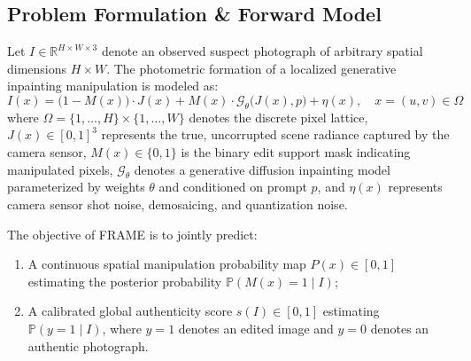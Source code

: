\documentclass[sigconf,review=true]{acmart}
\begin{document}
\subsection{Problem Formulation & Forward Model}
Let $I \in \mathbb{R}^{H \times W \times 3}$ denote an observed suspect photograph of arbitrary spatial dimensions $H \times W$. The photometric formation of a localized generative inpainting manipulation is modeled as:
\begin{equation}
    I(x) = \big(1 - M(x)\big) \cdot J(x) + M(x) \cdot \mathcal{G}_\theta\big(J(x), p\big) + \eta(x), \quad x = (u, v) \in \Omega
    \label{eq:forward_model}
\end{equation}
where $\Omega = \{1, \dots, H\} \times \{1, \dots, W\}$ denotes the discrete pixel lattice, $J(x) \in [0, 1]^3$ represents the true, uncorrupted scene radiance captured by the camera sensor, $M(x) \in \{0, 1\}$ is the binary edit support mask indicating manipulated pixels, $\mathcal{G}_\theta$ denotes a generative diffusion inpainting model parameterized by weights $\theta$ and conditioned on prompt $p$, and $\eta(x)$ represents camera sensor shot noise, demosaicing, and quantization noise.

The objective of FRAME is to jointly predict:
\begin{enumerate}
    \item A continuous spatial manipulation probability map $P(x) \in [0, 1]$ estimating the posterior probability $\mathbb{P}(M(x) = 1 \mid I)$;
    \item A calibrated global authenticity score $s(I) \in [0, 1]$ estimating $\mathbb{P}(y = 1 \mid I)$, where $y = 1$ denotes an edited image and $y = 0$ denotes an authentic photograph.
\end{enumerate}
\end{document}
